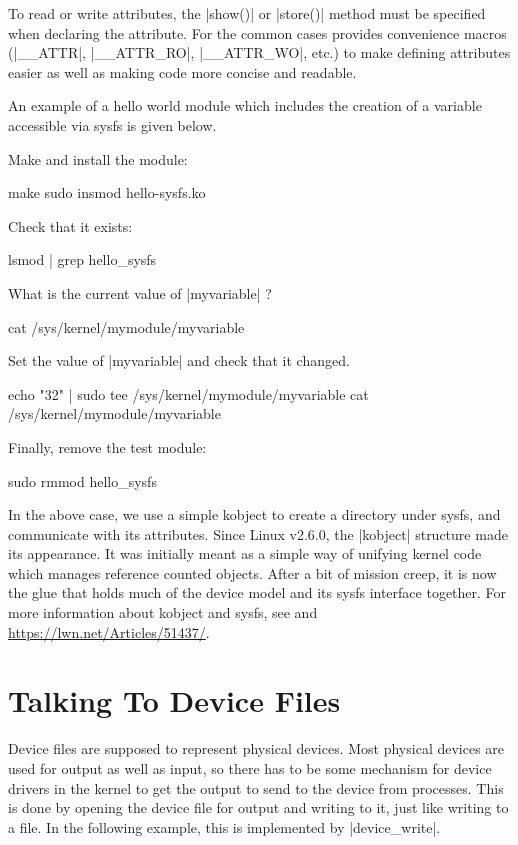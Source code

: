 \documentclass[10pt, oneside]{book}
\begin{document}
To read or write attributes, the \cpp|show()| or \cpp|store()| method must be specified when declaring the attribute.
For the common cases  provides convenience macros (\cpp|__ATTR|, \cpp|__ATTR_RO|, \cpp|__ATTR_WO|, etc.) to make defining attributes easier as well as making code more concise and readable.

An example of a hello world module which includes the creation of a variable accessible via sysfs is given below.


Make and install the module:

\begin{codebash}
make
sudo insmod hello-sysfs.ko
\end{codebash}

Check that it exists:

\begin{codebash}
lsmod | grep hello_sysfs
\end{codebash}

What is the current value of \cpp|myvariable| ?

\begin{codebash}
cat /sys/kernel/mymodule/myvariable
\end{codebash}

Set the value of \cpp|myvariable| and check that it changed.

\begin{codebash}
echo "32" | sudo tee /sys/kernel/mymodule/myvariable
cat /sys/kernel/mymodule/myvariable
\end{codebash}

Finally, remove the test module:

\begin{codebash}
sudo rmmod hello_sysfs
\end{codebash}

In the above case, we use a simple kobject to create a directory under sysfs, and communicate with its attributes.
Since Linux v2.6.0, the \cpp|kobject| structure made its appearance.
It was initially meant as a simple way of unifying kernel code which manages reference counted objects.
After a bit of mission creep, it is now the glue that holds much of the device model and its sysfs interface together.
For more information about kobject and sysfs, see  and \url{https://lwn.net/Articles/51437/}.

\section{Talking To Device Files}
\label{sec:device_files}
Device files are supposed to represent physical devices.
Most physical devices are used for output as well as input, so there has to be some mechanism for device drivers in the kernel to get the output to send to the device from processes.
This is done by opening the device file for output and writing to it, just like writing to a file.
In the following example, this is implemented by \cpp|device_write|.
\end{document}
